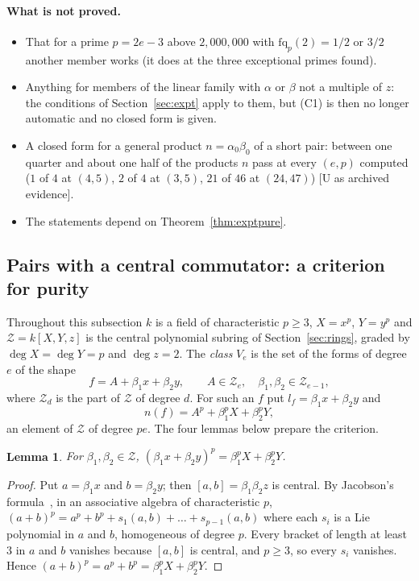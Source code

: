 \documentclass[11pt]{article}
\newtheorem{lemma}{Lemma}
\theoremstyle{definition}
\theoremstyle{remark}
\begin{document}
\paragraph{What is not proved.}
\begin{itemize}
\item That for a prime $p=2e-3$ above $2{,}000{,}000$ with $\mathrm{fq}_p(2)=1/2$ or $3/2$ another member works (it does at the three exceptional primes found).
\item Anything for members of the linear family with $\alpha$ or $\beta$ not a multiple of $z$: the conditions of Section~\ref{sec:expt} apply to them, but (C1) is then no longer automatic and no closed form is given.
\item A closed form for a general product $n=\alpha_0\beta_0$ of a short pair: between one quarter and about one half of the products $n$ pass at every $(e,p)$ computed ($1$ of $4$ at $(4,5)$, $2$ of $4$ at $(3,5)$, $21$ of $46$ at $(24,47)$) [U as archived evidence].
\item The statements depend on Theorem~\ref{thm:exptpure}.
\end{itemize}

\subsection{Pairs with a central commutator: a criterion for purity}
\label{sec:criterion}

Throughout this subsection $k$ is a field of characteristic $p\ge3$, $X=x^p$, $Y=y^p$ and $\mathcal Z=k[X,Y,z]$ is the central polynomial subring of Section~\ref{sec:rings}, graded by $\deg X=\deg Y=p$ and $\deg z=2$. The \emph{class} $V_e$ is the set of the forms of degree $e$ of the shape
\begin{equation}\label{eq:Ve}
f=A+\beta_1x+\beta_2y,\qquad A\in\mathcal Z_e,\quad\beta_1,\beta_2\in\mathcal Z_{e-1},
\end{equation}
where $\mathcal Z_d$ is the part of $\mathcal Z$ of degree $d$. For such an $f$ put $l_f=\beta_1x+\beta_2y$ and
\begin{equation}\label{eq:nf}
n(f)=A^p+\beta_1^pX+\beta_2^pY,
\end{equation}
an element of $\mathcal Z$ of degree $pe$. The four lemmas below prepare the criterion.

\begin{lemma}\label{lem:jacobson}
For $\beta_1,\beta_2\in\mathcal Z$, $(\beta_1x+\beta_2y)^p=\beta_1^pX+\beta_2^pY$.
\end{lemma}
\begin{proof}
Put $a=\beta_1x$ and $b=\beta_2y$; then $[a,b]=\beta_1\beta_2z$ is central. By Jacobson's formula~\cite[Chapter~V, Section~7]{Jacobson}, in an associative algebra of characteristic $p$, $(a+b)^p=a^p+b^p+s_1(a,b)+\dots+s_{p-1}(a,b)$ where each $s_i$ is a Lie polynomial in $a$ and $b$, homogeneous of degree $p$. Every bracket of length at least $3$ in $a$ and $b$ vanishes because $[a,b]$ is central, and $p\ge3$, so every $s_i$ vanishes. Hence $(a+b)^p=a^p+b^p=\beta_1^pX+\beta_2^pY$.
\end{proof}
\end{document}
